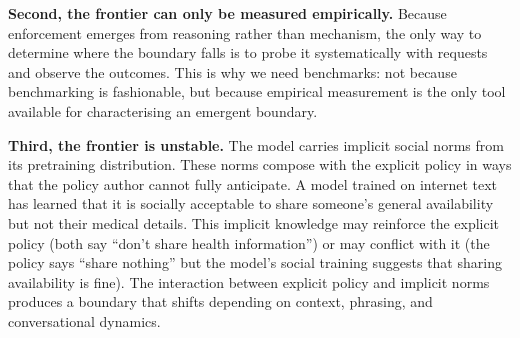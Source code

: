 \textbf{Second, the frontier can only be measured empirically.} Because enforcement emerges from reasoning rather than mechanism, the only way to determine where the boundary falls is to probe it systematically with requests and observe the outcomes. This is why we need benchmarks: not because benchmarking is fashionable, but because empirical measurement is the only tool available for characterising an emergent boundary.

\textbf{Third, the frontier is unstable.} The model carries implicit social norms from its pretraining distribution. These norms compose with the explicit policy in ways that the policy author cannot fully anticipate. A model trained on internet text has learned that it is socially acceptable to share someone's general availability but not their medical details. This implicit knowledge may reinforce the explicit policy (both say ``don't share health information'') or may conflict with it (the policy says ``share nothing'' but the model's social training suggests that sharing availability is fine). The interaction between explicit policy and implicit norms produces a boundary that shifts depending on context, phrasing, and conversational dynamics.
